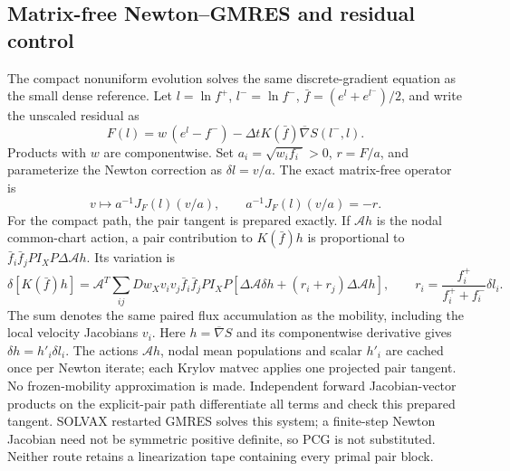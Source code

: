 \documentclass[11pt,letterpaper]{article}
\begin{document}
\subsection*{Matrix-free Newton--GMRES and residual control}
The compact nonuniform evolution solves the same discrete-gradient equation
as the small dense reference. Let $l=\ln f^+$, $l^-=\ln f^-$,
$\bar f=(e^l+e^{l^-})/2$, and write the unscaled residual as
\begin{equation}
 F(l)=w\,(e^l-f^-)-\Delta t K(\bar f)\overline\nabla S(l^-,l).
 \label{eq:dgrootresidual}
\end{equation}
Products with $w$ are componentwise. Set $a_i=\sqrt{w_i f_i^-}>0$,
$r=F/a$, and parameterize the Newton correction as $\delta l=v/a$.
The exact matrix-free operator is
\begin{equation}
 v\longmapsto a^{-1}J_F(l)(v/a),\qquad
 a^{-1}J_F(l)(v/a)=-r.
 \label{eq:scalednewton}
\end{equation}
For the compact path, the pair tangent is prepared exactly. If
$\mathcal A h$ is the nodal common-chart action, a pair contribution to
$K(\bar f)h$ is proportional to
$\bar f_i\bar f_j P I_XP\Delta\mathcal A h$. Its variation is
\begin{equation}
 \delta[K(\bar f)h]=\mathcal A^T\sum_{ij}
 D w_Xv_iv_j\bar f_i\bar f_j P I_XP
 \left[\Delta\mathcal A\delta h
       +(r_i+r_j)\Delta\mathcal A h\right],\qquad
 r_i=\frac{f_i^+}{f_i^++f_i^-}\delta l_i.
 \label{eq:preparedpairtangent}
\end{equation}
The sum denotes the same paired flux accumulation as the mobility, including
the local velocity Jacobians $v_i$. Here $h=\overline\nabla S$ and its
componentwise derivative gives $\delta h=h'_i\delta l_i$.
The actions $\mathcal A h$, nodal mean populations and scalar $h'_i$ are
cached once per Newton iterate; each Krylov matvec applies one projected pair
tangent. No frozen-mobility approximation is made. Independent forward
Jacobian-vector products on the explicit-pair path differentiate all terms
and check this prepared tangent. SOLVAX restarted GMRES solves this system; a finite-step
Newton Jacobian need not be symmetric positive definite, so PCG is not
substituted. Neither route retains a linearization tape containing every
primal pair block.
\end{document}
